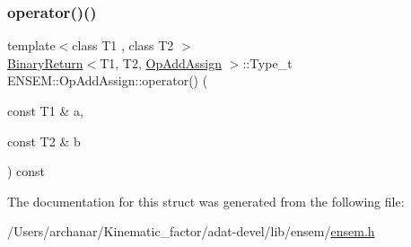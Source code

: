 \subsubsection{\texorpdfstring{operator()()}{operator()()}\hspace{0.1cm}{\footnotesize\ttfamily [3/3]}}
{\footnotesize\ttfamily template$<$class T1 , class T2 $>$ \\
\mbox{\hyperlink{structENSEM_1_1BinaryReturn}{Binary\+Return}}$<$T1, T2, \mbox{\hyperlink{structENSEM_1_1OpAddAssign}{Op\+Add\+Assign}} $>$\+::Type\+\_\+t E\+N\+S\+E\+M\+::\+Op\+Add\+Assign\+::operator() (\begin{DoxyParamCaption}\item[{const T1 \&}]{a,  }\item[{const T2 \&}]{b }\end{DoxyParamCaption}) const\hspace{0.3cm}{\ttfamily [inline]}}



The documentation for this struct was generated from the following file\+:\begin{DoxyCompactItemize}
\item 
/\+Users/archanar/\+Kinematic\+\_\+factor/adat-\/devel/lib/ensem/\mbox{\hyperlink{adat-devel_2lib_2ensem_2ensem_8h}{ensem.\+h}}\end{DoxyCompactItemize}
